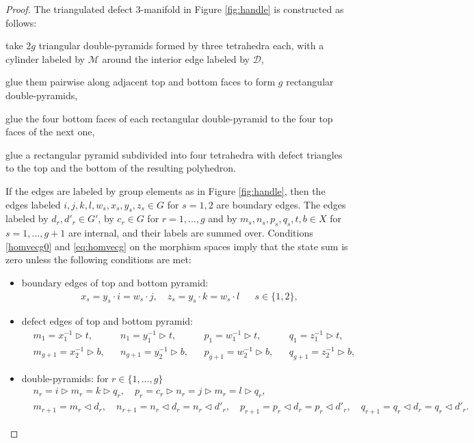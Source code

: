 \documentclass[1.5pt, a4paper]{article}
\newcommand{\mad}{\mathcal D}
\newcommand{\mam}{\mathcal M}
\newcommand{\inv}[0]{{-1}}
\begin{document}
\begin{proof}
The triangulated defect 3-manifold in Figure \ref{fig:handle} is constructed as follows:
\begin{compactitem}
\item take $2g$ triangular double-pyramids formed by three tetrahedra each,  with a cylinder labeled by $\mam$ around the interior edge labeled by $\mad$,
\item glue them pairwise along  adjacent top and bottom faces to form $g$ rectangular double-pyramids,
\item glue the four bottom faces of each rectangular double-pyramid to the four top faces of the next one, 
\item glue a rectangular pyramid subdivided into four tetrahedra with defect triangles to the top and the bottom of the resulting polyhedron. 
\end{compactitem}
If the edges are labeled by group elements as in Figure \ref{fig:handle}, then
the edges labeled $ i,j,k,l, w_s,x_s,y_s, z_s\in G$  for $s=1,2$ are boundary edges.  The edges labeled by  $d_r,d'_r\in G'$, by $c_r\in G$ for $r=1,...,g$ and by $m_s,n_s,p_s,q_s, t,b\in X$  for $s=1,...,g+1$ are internal, and their labels are summed over.  Conditions \eqref{homvecg0} and \eqref{eq:homvecg} on the  morphism spaces imply that the state sum  is zero unless the following conditions are met:
\begin{itemize}
\item boundary edges of top and bottom pyramid:
\begin{align}
\label{eq:topcond}
&x_s=y_s\cdot i=w_s\cdot j,\quad z_s= y_s\cdot k=w_s\cdot l & &s\in\{1,2\},
\end{align}
\item defect edges of top and bottom pyramid:
\begin{align}\label{eq:topint}
&m_1=x_1^\inv\rhd t, & &n_1=y_1^\inv \rhd t, & &p_1=w_1^\inv\rhd t, & &q_1=z_1^\inv\rhd t,\\
&m_{g+1}=x_2^\inv\rhd b, & &n_{g+1}=y_2^\inv \rhd b, & &p_{g+1}=w_2^\inv\rhd b, & &q_{g+1}=z_2^\inv\rhd b,\nonumber
\end{align}
\item  double-pyramids: for $r\in \{1,...,g\}$
\begin{align}\label{eq:doublep}
&n_r=i\rhd m_r=k\rhd q_r, \quad p_r=c_r\rhd n_r=j\rhd m_r=l\rhd q_r,\\
&m_{r+1}=m_r\lhd d_r, \quad n_{r+1}=n_r\lhd d_r=n_r\lhd d'_r, \quad p_{r+1}=p_r\lhd d_r=p_r\lhd d'_r, \quad q_{r+1}=q_r\lhd d_r=q_r\lhd d'_r.\nonumber

\end{align}
\end{itemize}
\end{proof}
\end{document}
